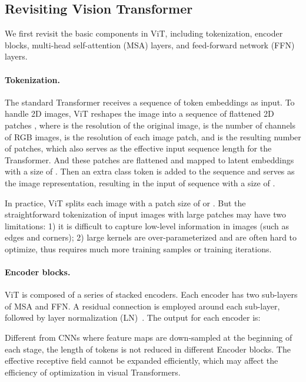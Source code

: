 \documentclass[10pt,twocolumn,letterpaper]{article}
\begin{document}
\subsection{Revisiting Vision Transformer}\label{sec:vit_overview}

We first revisit the basic components in ViT, including tokenization, encoder blocks, multi-head self-attention (MSA) layers, and feed-forward network (FFN) layers.

\paragraph{Tokenization.} The standard Transformer \cite{DBLP:conf/nips/VaswaniSPUJGKP17} receives a sequence of token embeddings as input. To handle 2D images, ViT reshapes the image  into a sequence of flattened 2D patches , where  is the resolution of the original image,  is the number of channels of RGB images,  is the resolution of each image patch, and  is the resulting number of patches, which also serves as the effective input sequence length for the Transformer. And these patches are flattened and mapped to latent embeddings with a size of . Then an extra class token is added to the sequence and serves as the image representation, resulting in the input of sequence with a size of .

In practice, ViT splits each image with a patch size of  or . But the straightforward tokenization of input images with large patches may have two limitations: 1) it is difficult to capture low-level information in images (such as edges and corners); 2) large kernels are over-parameterized and are often hard to optimize, thus requires much more training samples or training iterations.

\paragraph{Encoder blocks.} ViT is composed of a series of stacked encoders. Each encoder has two sub-layers of MSA and FFN. A residual connection \cite{DBLP:conf/cvpr/HeZRS16} is employed around each sub-layer, followed by layer normalization (LN)~\cite{DBLP:journals/corr/BaKH16}. The output for each encoder is:


Different from CNNs where feature maps are down-sampled at the beginning of each stage, the length of tokens is not reduced in different Encoder blocks. The effective receptive field cannot be expanded efficiently, which may affect the efficiency of optimization in visual Transformers.
\end{document}
